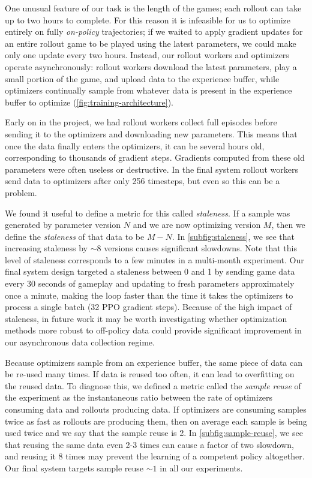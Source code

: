 \documentclass[11pt]{article}
\begin{document}
One unusual feature of our task is the length of the games; each rollout can take up to two hours to complete.
For this reason it is infeasible for us to optimize entirely on fully {\it on-policy} trajectories; 
if we waited to apply gradient updates for an entire rollout game to be played using the latest parameters, we could make only one update every two hours.
Instead, our rollout workers and optimizers operate asynchronously: rollout workers download the latest parameters, play a small portion of the game, and upload data to the experience buffer, while optimizers continually sample from whatever data is present in the experience buffer to optimize (\autoref{fig:training-architecture}).

Early on in the project, we had rollout workers collect full episodes before sending it to the optimizers and downloading new parameters. 
This means that once the data finally enters the optimizers, it can be several hours old, corresponding to thousands of gradient steps. 
Gradients computed from these old parameters were often useless or destructive.
In the final system rollout workers send data to optimizers after only 256 timesteps, but even so this can be a problem. 

We found it useful to define a metric for this called {\it staleness}. If a sample was generated by parameter version $N$ and we are now optimizing version $M$, then we define the {\it staleness} of that data to be $M-N$. 
In \autoref{subfig:staleness}, we see that increasing staleness by $\sim8$ versions causes significant slowdowns. 
Note that this level of staleness corresponds to a few minutes in a multi-month experiment.
Our final system design targeted a staleness between 0 and 1 by sending game data every 30 seconds of gameplay and updating to fresh parameters approximately once a minute, making the loop faster than the time it takes the optimizers to process a single batch (32 PPO gradient steps).
Because of the high impact of staleness, in future work it may be worth investigating whether optimization methods more robust to off-policy data could provide significant improvement in our asynchronous data collection regime.

Because optimizers sample from an experience buffer, the same piece of data can be re-used many times. 
If data is reused too often, it can lead to overfitting on the reused data\cite{horgan2018apex}.
To diagnose this, we defined a metric called the {\it sample reuse} of the experiment as the instantaneous ratio between the rate of optimizers consuming data and rollouts producing data. 
If optimizers are consuming samples twice as fast as rollouts are producing them, then on average each sample is being used twice and we say that the sample reuse is 2.
In \autoref{subfig:sample-reuse}, we see that reusing the same data even 2-3 times can cause a factor of two slowdown, and reusing it 8 times may prevent the learning of a competent policy altogether.
Our final system targets sample reuse $\sim1$ in all our experiments.
\end{document}
